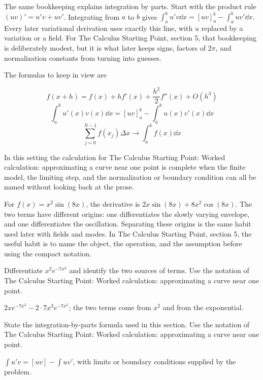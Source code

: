 The same bookkeeping explains integration by parts.  Start with the product rule \((uv)'=u'v+uv'\).  Integrating from \(a\) to \(b\) gives \(\int_a^b u'v\dd x=[uv]_a^b-\int_a^buv'\dd x\).  Every later variational derivation uses exactly this line, with \(u\) replaced by a variation or a field.  For The Calculus Starting Point, section 5, that bookkeeping is deliberately modest, but it is what later keeps signs, factors of \(2\pi\), and normalization constants from turning into guesses.

The formulas to keep in view are

\[
  f(x+h)=f(x)+hf'(x)+\frac{h^2}{2}f''(x)+O(h^3)
\]
\[
  \int_a^b u'(x)v(x)\dd x=[uv]_a^b-\int_a^b u(x)v'(x)\dd x
\]
\[
  \sum_{j=0}^{N-1}f(x_j)\Delta x\longrightarrow \int_a^b f(x)\dd x
\]

In this setting the calculation for The Calculus Starting Point: Worked calculation: approximating a curve near one point is complete when the finite model, the limiting step, and the normalization or boundary condition can all be named without looking back at the prose.




\begin{example}
For \(f(x)=x^2\sin(8x)\), the derivative is \(2x\sin(8x)+8x^2\cos(8x)\).  The two terms have different origins: one differentiates the slowly varying envelope, and one differentiates the oscillation.  Separating these origins is the same habit used later with fields and modes.  In The Calculus Starting Point, section 5, the useful habit is to name the object, the operation, and the assumption before using the compact notation.
\end{example}



\begin{exercise}
Differentiate \(x^2e^{-7x^2}\) and identify the two sources of terms.  Use the notation of The Calculus Starting Point: Worked calculation: approximating a curve near one point.
\begin{answer}
\(2xe^{-7x^2}-2\cdot 7x^3e^{-7x^2}\); the two terms come from \(x^2\) and from the exponential.
\end{answer}
\end{exercise}

\begin{exercise}
State the integration-by-parts formula used in this section.  Use the notation of The Calculus Starting Point: Worked calculation: approximating a curve near one point.
\begin{answer}
\(\int u'v=[uv]-\int uv'\), with limits or boundary conditions supplied by the problem.
\end{answer}
\end{exercise}



